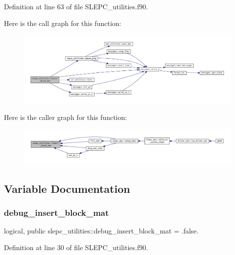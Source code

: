 Definition at line 63 of file S\+L\+E\+P\+C\+\_\+utilities.\+f90.

Here is the call graph for this function\+:
\nopagebreak
\begin{figure}[H]
\begin{center}
\leavevmode
\includegraphics[width=350pt]{namespaceslepc__utilities_ae6568f825f3fa8a6e3d45f67f3daf412_cgraph}
\end{center}
\end{figure}
Here is the caller graph for this function\+:
\nopagebreak
\begin{figure}[H]
\begin{center}
\leavevmode
\includegraphics[width=350pt]{namespaceslepc__utilities_ae6568f825f3fa8a6e3d45f67f3daf412_icgraph}
\end{center}
\end{figure}


\subsection{Variable Documentation}
\mbox{\label{namespaceslepc__utilities_a5cb92553633cb22ff703286298862ac7}} 
\subsubsection{\texorpdfstring{debug\+\_\+insert\+\_\+block\+\_\+mat}{debug\_insert\_block\_mat}}
{\footnotesize\ttfamily logical, public slepc\+\_\+utilities\+::debug\+\_\+insert\+\_\+block\+\_\+mat = .false.}



Definition at line 30 of file S\+L\+E\+P\+C\+\_\+utilities.\+f90.

